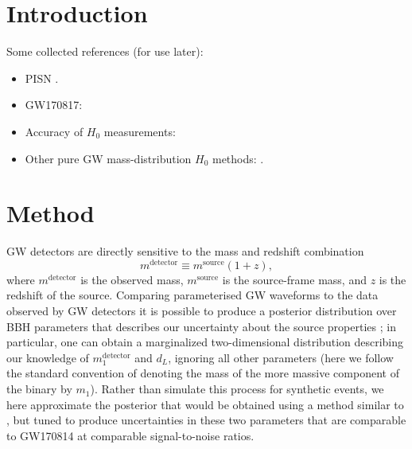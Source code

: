 \documentclass[modern]{aastex62}
\newcommand{\mdet}{m^\mathrm{detector}}
\newcommand{\monedet}{m_1^\mathrm{detector}}
\newcommand{\msource}{m^\mathrm{source}}
\begin{document}
\section{Introduction}

Some collected references (for use later):

\begin{itemize}
  \item \ac{PISN} \cite{Heger2002,Belczynski2016,Woosley2017,Spera2017}.
  \item GW170817: \cite{GW170817,GW170817-H0}
  \item Accuracy of $H_0$ measurements: \cite{GW170817-H0,Chen2017}
  \item Other pure GW mass-distribution $H_0$ methods: \citet{Taylor2012,Messenger2012}.
\end{itemize}

\section{Method}
\label{sec:method}

\Ac{GW} detectors are directly sensitive to the mass and redshift combination
%
\begin{equation}
  \label{eq:Mdet-definition}
  \mdet \equiv \msource \left( 1 + z \right),
\end{equation}
%
where $\mdet$ is the observed mass, $\msource$ is the source-frame mass, and $z$
is the redshift of the source.  Comparing parameterised \ac{GW} waveforms
\citep[e.g.][]{Taracchini2014,Bohe2017,Smith2016,Kahn2016,Chatziioannou2017} to
the data observed by \ac{GW} detectors it is possible to produce a posterior
distribution over \ac{BBH} parameters that describes our uncertainty about the
source properties \citep{Veitch2015,GW150914-PE}; in particular, one can obtain
a marginalized two-dimensional distribution describing our knowledge of
$\monedet$ and $d_L$, ignoring all other parameters (here we follow the standard
convention of denoting the mass of the more massive component of the binary by
$m_1$).  Rather than simulate this process for synthetic events, we here
approximate the posterior that would be obtained using a method similar to
\citet{Fishbach2018}, but tuned to produce uncertainties in these two parameters
that are comparable to GW170814 \citep{GW170814} at comparable signal-to-noise
ratios.
\end{document}
